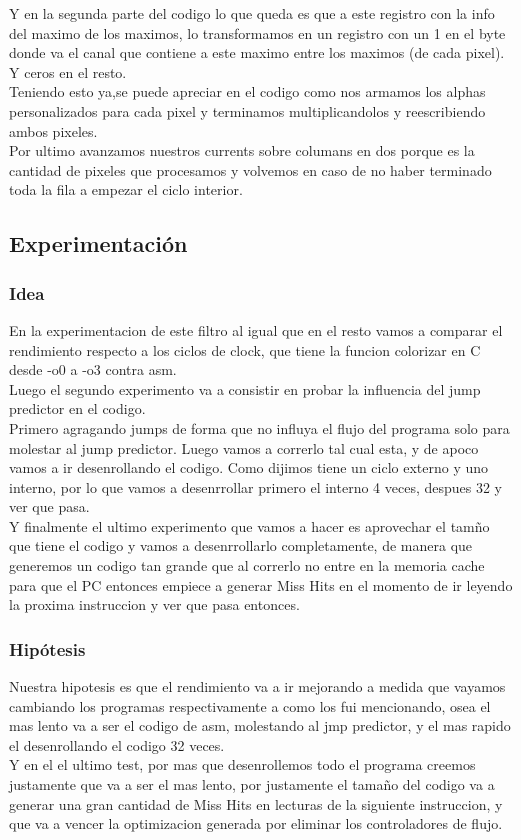 	
	
   Y en la segunda parte del codigo lo que queda es que a este registro con la info del maximo de los maximos, lo transformamos en un registro con un 1 en el byte donde va el canal que contiene a este maximo entre los maximos (de cada pixel). Y ceros en el resto. \\ Teniendo esto ya,se puede apreciar en el codigo como nos armamos los alphas personalizados para cada pixel y terminamos multiplicandolos y reescribiendo ambos pixeles. \\
   Por ultimo avanzamos nuestros currents sobre columans en dos porque es la cantidad de pixeles que procesamos y  volvemos en caso de no haber terminado toda la fila a empezar el ciclo interior.
	
	
\subsection{Experimentación}
\subsubsection{Idea}	En la experimentacion de este filtro al igual que en el resto vamos a comparar el rendimiento respecto a los ciclos de clock, que tiene la funcion colorizar en C desde -o0 a -o3 contra asm. \\ Luego el segundo experimento va a consistir en probar la influencia del jump predictor en el codigo.\\ Primero agragando jumps de forma que no influya el flujo del programa solo para molestar al jump predictor.  Luego vamos a correrlo tal cual esta, y de apoco vamos a ir desenrollando el codigo. Como dijimos tiene un ciclo externo y uno interno, por lo que vamos a desenrrollar primero el interno 4 veces, despues 32 y ver que pasa.\\
Y finalmente el ultimo experimento que vamos a hacer es aprovechar el tamño que tiene el codigo y vamos a desenrrollarlo completamente, de manera que generemos un codigo tan grande que al correrlo no entre en la memoria cache para que el PC entonces empiece a generar Miss Hits en el momento de ir leyendo la proxima instruccion y ver que pasa entonces.
	   
\subsubsection{Hipótesis}
	Nuestra hipotesis es que el rendimiento va a ir mejorando a medida que vayamos cambiando los programas respectivamente a como los fui mencionando, osea el mas lento va a ser el codigo de asm, molestando al jmp predictor, y el mas rapido el desenrollando el codigo 32 veces. \\
	Y en el el ultimo test, por mas que desenrollemos todo el programa creemos justamente que va a ser el mas lento, por justamente el tamaño del codigo va a generar una gran cantidad de Miss Hits en lecturas de la siguiente instruccion, y que va a vencer la optimizacion generada por eliminar los controladores de flujo.	
	
